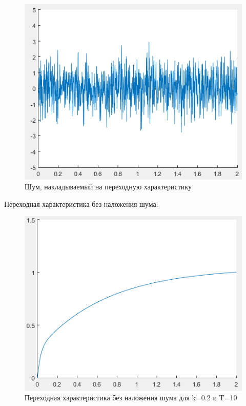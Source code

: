 \documentclass[14pt,a4paper,report]{report}
\begin{document}
\begin{figure}[h!]
	\centering
	\includegraphics[scale = 0.75]{images/noice.png}
	\caption{Шум, накладываемый на переходную характеристику}
	\label{image:3}
\end{figure}

\clearpage

Переходная характеристика без наложения шума:

\begin{figure}[h!]
	\centering
	\includegraphics[scale = 0.70]{images/step10.png}
	\caption{Переходная характеристика без наложения шума для k=0.2 и T=10}
	\label{image:4}
\end{figure}
\end{document}
